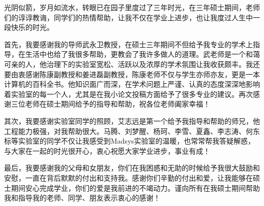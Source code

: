 \begin{acknowledgement}
	光阴似箭，岁月如流水，转眼已在园子里度过了三年时光，在三年硕士期间，老师们的谆谆教诲，同学们的热情帮助，让我不仅在学业上进步，也让我度过人生中一段快乐的时光。
	
	首先，我要感谢我的导师武永卫教授，在硕士三年期间不但给予我专业的学术上指导，在生活中也给了我很多帮助，更教会了我许多做人的道理。武老师是一个和蔼可亲的人，他治理下的实验室宽松、活跃以及浓厚的学术氛围让我收获颇丰。我还要由衷感谢陈康副教授和姜进磊副教授，陈康老师不仅与学生亦师亦友，更是一本计算机的百科全书。他知识面广而深，在学术问题上严谨、认真的态度深深地影响着实验室的每一个人，尤其是在我小论文投稿方面给予了很多专业的建议。再次感谢三位老师在硕士期间给予的指导和帮助，祝各位老师阖家幸福！
	
	其次，我要感谢实验室同学的照顾，艾志远是第一个给予我指导和帮助的师兄，他工程能力极强，对我帮助很大。马腾、刘梦醒、杨珂、李雪、夏鑫、李志涛、何东标等实验室的同学不仅让我感受到Madsys实验室的温暖，也常常帮我答疑解惑，与大家在一起的时光很开心，衷心祝愿大家学业进步，事业有成！
	
	最后，我要感谢我的父母和女朋友，你们在我困惑和无助的时候给予我很大鼓励和安慰，一直在背后默默的付出和支持我。感谢你们辛勤的付出和爱，让我能够在硕士期间安心完成学业，你们的爱是我前进的不竭动力。谨向所有在我硕士期间帮助我和指导我的老师、同学、朋友表示衷心的感谢！
	
\end{acknowledgement}
